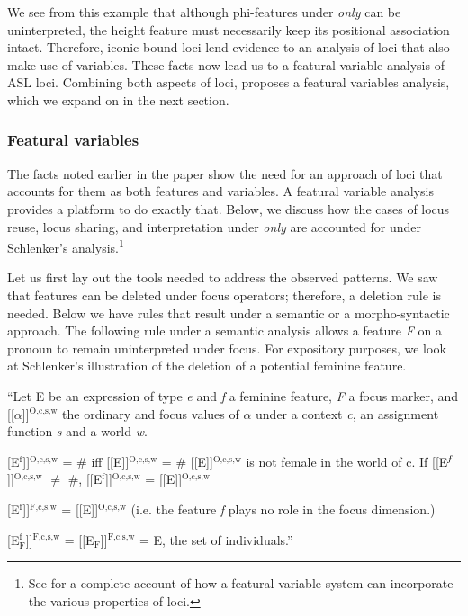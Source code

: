 \documentclass[output=paper,
modfonts
]{langscibook}
\begin{document}
We see from this example that although phi-features under \textit{only} can be uninterpreted, the height feature must necessarily keep its positional association intact. Therefore, iconic bound loci lend evidence to an analysis of loci that also make use of variables. These facts now lead us to a featural variable analysis of ASL loci. Combining both aspects of loci, \citet{Schlenker2014} proposes a featural variables analysis, which we expand on in the next section. 

\subsubsection{Featural variables}

The facts noted earlier in the paper show the need for an approach of loci that accounts for them as both features and variables. A featural variable analysis \citep{Schlenker2014} provides a platform to do exactly that. Below, we discuss how the cases of locus reuse, locus sharing, and interpretation under \textit{only} are accounted for under Schlenker's analysis.\footnote{See \citet{Schlenker2014} for a complete account of how a featural variable system can incorporate the various properties of loci.}  

Let us first lay out the tools needed to address the observed patterns. We saw that features can be deleted under focus operators; therefore, a deletion rule is needed. Below we have rules that result under a semantic or a morpho-syntactic approach. The following rule under a semantic analysis allows a feature \textit{F} on a pronoun to remain uninterpreted under focus. For expository purposes, we look at Schlenker's illustration of the deletion of a potential feminine feature.  

\begin{exe}
	\ex \label{ex:irani:74}``Let E be an expression of type \textit{e} and \textit{f} a feminine feature, \textit{F} a focus marker, and {[}[\(\alpha\){]}]$^\text{{O,c,s,w}}$ the ordinary and focus values of \(\alpha\) under a context \textit{c}, an assignment function \textit{s} and a world \textit{w}.
	
	\begin{xlist}
		\ex {[}[E$^\text{{f}}${]}]$^\text{{O,c,s,w}}$ = \# iff {[}[E{]}]$^\text{{O,c,s,w}}$ = \# {[}[E{]}]$^\text{{O,c,s,w}}$ is not female in the world of c. If {[}[E$^\text{\textit{f}}${]}]$^\text{{O,c,s,w}}$ \(\neq\) \#, {[}[E$^\text{{f}}${]}]$^\text{{O,c,s,w}}$ = {[}[E{]}]$^\text{{O,c,s,w}}$
		
		\ex {[}[E$^\text{{f}}${]}]$^\text{{F,c,s,w}}$ = {[}[E{]}]$^\text{{O,c,s,w}}$ (i.e. the feature \textit{f} plays no role in the focus dimension.)
		
		\ex {[}[E$^\text{{f}}_\text{{F}}${]}]$^\text{{F,c,s,w}}$ = {[}[E$_\text{{F}}${]}]$^\text{{F,c,s,w}}$ = E, the set of individuals.'' \citep[1070]{Schlenker2014}
	\end{xlist}
	
\end{exe}
\end{document}
